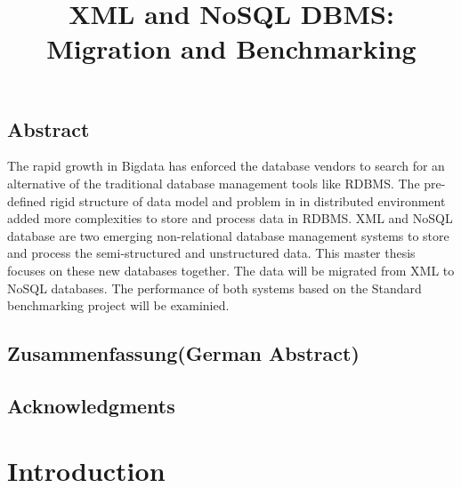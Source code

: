 \documentclass[a4paper,12pt]{book}
\title{XML and NoSQL DBMS: Migration and Benchmarking}
\subtitle{
}
\begin{document}
	\renewcommand{\lstlistingname}{Code}
	\maketitle
	\thispagestyle{empty}
	\newpage
	\section*{Abstract}
	The rapid growth in Bigdata has enforced the database vendors to search for an alternative of the traditional database management tools like RDBMS. The pre-defined rigid structure of data model and problem in in distributed environment added  more complexities to store and process data in RDBMS. XML and NoSQL database are two emerging non-relational database management systems to store and process the semi-structured and unstructured data.
	This master thesis focuses on these new databases together. The data will be migrated from XML to NoSQL databases. The performance of both systems based on the Standard benchmarking project will be examinied.
	
	
	 
		
		
	
	\section*{Zusammenfassung(German Abstract)}
	
	\section*{Acknowledgments}
	
	\thispagestyle{empty}
	\newpage
	\tableofcontents
	\thispagestyle{empty}
	\newpage
	\chapter{Introduction}
	\setcounter{page}{1}
		
\end{document}
